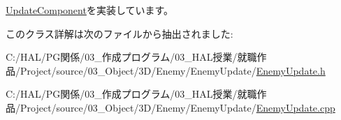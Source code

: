 \mbox{\hyperlink{class_update_component_ade313ad8bf19a81e7d098aa830d9f01b}{Update\+Component}}を実装しています。



このクラス詳解は次のファイルから抽出されました\+:\begin{DoxyCompactItemize}
\item 
C\+:/\+H\+A\+L/\+P\+G関係/03\+\_\+作成プログラム/03\+\_\+\+H\+A\+L授業/就職作品/\+Project/source/03\+\_\+\+Object/3\+D/\+Enemy/\+Enemy\+Update/\mbox{\hyperlink{_enemy_update_8h}{Enemy\+Update.\+h}}\item 
C\+:/\+H\+A\+L/\+P\+G関係/03\+\_\+作成プログラム/03\+\_\+\+H\+A\+L授業/就職作品/\+Project/source/03\+\_\+\+Object/3\+D/\+Enemy/\+Enemy\+Update/\mbox{\hyperlink{_enemy_update_8cpp}{Enemy\+Update.\+cpp}}\end{DoxyCompactItemize}
